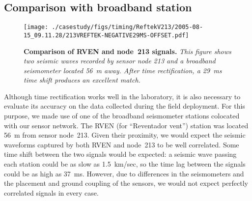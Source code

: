

\subsection{Comparison with broadband station}
\label{sec-datagroundtruthing}

\begin{figure}[t]
\begin{center}
\texttt{[image: ./casestudy/figs/timing/ReftekV213/2005-08-15\_09.11.28/213VREFTEK-NEGATIVE29MS-OFFSET.pdf]}
\end{center}
\caption{\small {\bf Comparison of RVEN and node~213 signals.} 
{\em This figure shows two seismic waves recorded by sensor node 213 and a
broadband seismometer located 56~m away. After time rectification, a 29~ms
time shift produces an excellent match.}}
\label{fig-rvenv213}
\end{figure}

Although time rectification works well in the laboratory, it is also
necessary to evaluate its accuracy on the data collected during the field
deployment. For this purpose, we made use of one of the broadband seismometer
stations colocated with our sensor network. The RVEN (for ``Reventador
vent'') station was located 56~m from sensor node~213.  
Given their proximity, we would expect
the seismic waveforms captured by both RVEN and node~213 to be
well correlated.  Some time shift between the two signals would be expected:
a seismic wave passing each station could be as slow as 1.5~km/sec, so
the time lag between the signals could be as high as 37~ms.  However, due to
differences in the seismometers and the placement and ground coupling of the
sensors, we would not expect perfectly correlated signals in every
case.


